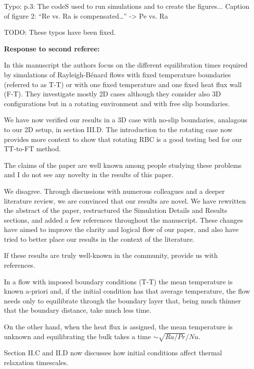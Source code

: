 \documentclass[aps, 11pt, singlecolumn]{revtex4-1} %
\begin{document}
\begin{singlespace}
\begin{myquotation}
Typo:
p.3: The codeS used to run simulations and to create the figures...
Caption of figure 2: “Re vs. Ra is compensated…” -> Pe vs. Ra
\end{myquotation}
TODO: These typos have been fixed.

\newpage
\noindent
\Large{\textbf{Response to second referee:}}\newline$\,$\newline\indent
\begin{myquotation}
In this manuscript the authors focus on the different equilibration times required by simulations of Rayleigh-B\'{e}nard flows with fixed temperature boundaries (referred to as T-T) or with one fixed temperature and one fixed heat flux wall (F-T). 
They investigate mostly 2D cases although they consider also 3D configurations but in a rotating environment and with free slip boundaries. 
\end{myquotation}
We have now verified our results in a 3D case with no-slip boundaries, analagous to our 2D setup, in section III.D.
The introduction to the rotating case now provides more context to show that rotating RBC is a good testing bed for our TT-to-FT method.

\begin{myquotation}
The claims of the paper are well known among people studying these problems and I do not see any novelty in the results of this paper. 
\end{myquotation}
We disagree.
Through discussions with numerous colleagues and a deeper literature review, we are convinced that our results are novel.
We have rewritten the abstract of the paper, restructured the Simulation Details and Results sections, and added a few references throughout the manuscript.
These changes have aimed to improve the clarity and logical flow of our paper, and also have tried to better place our results in the context of the literature.

If these results are truly well-known in the community, provide us with references.

\begin{myquotation}
In a flow with imposed boundary conditions (T-T) the mean temperature is known a-priori and, if the initial condition has that average temperature, the flow needs only to equilibrate through the boundary layer that, being much thinner that the boundary distance, take much less time.

On the other hand, when the heat flux is assigned, the mean temperature is unknown and equilibrating the bulk takes a time $\sim\sqrt{Ra/Pr}/Nu$. 
\end{myquotation}
Section II.C and II.D now discusses how initial conditions affect thermal relaxation timescales.


\end{singlespace}
\end{document}
